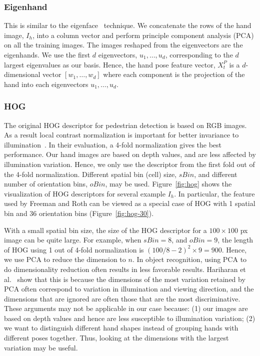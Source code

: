 \documentclass{acm_proc_article-sp}
\begin{document}
\subsubsection{Eigenhand}\label{sec:eigenhand}
This is similar to the eigenface~\cite{turk91} technique. We concatenate the
rows of the hand image, $I_h$, into a column vector and perform principle
component analysis (PCA) on all the training images. The images
reshaped from the eigenvectors are the eigenhands. We use
the first $d$ eigenvectors, $u_1, \ldots, u_d$, corresponding to the 
$d$ largest eigenvalues as our basis.
Hence, the hand pose feature vector, $X_t^P$ is a $d$-dimensional vector $[w_1,
\ldots, w_d]$ where each component is the projection of the hand into each
eigenvectors $u_1, \ldots, u_d$.

\subsubsection{HOG}\label{sec:hog}
The original HOG descriptor for pedestrian detection is based on RGB images. As
a result local contrast normalization is important for better invariance to
illumination~\cite{dalal05}. In their evaluation, a 4-fold normalization
gives the best performance. Our hand images are based on depth values, and are less
affected by illumination variation. Hence, we only use the descriptor from the first fold
out of the 4-fold normalization. Different spatial bin (cell) size, $sBin$, and
different number of orientation bins, $oBin$, may be used. Figure~\ref{fig:hog}
shows the visualization of HOG descriptors for several example $I_h$.
In particular, the feature used by Freeman and Roth can be viewed 
as a special case of HOG with 1 spatial bin and 36 orientation bins (Figure~\ref{fig:hog-30}).

With a small spatial bin size, the size of the HOG descriptor for a $100\times 100$ px image can be
quite large. For example, when $sBin = 8$, and $oBin = 9$, the length of HOG using 1 out of 4-fold
normalization is $(100/8 - 2)^2\times 9 = 900$. Hence, we use PCA to reduce the dimension to $n$.
In object recognition, using PCA to do dimensionality reduction often results in less
favorable results. Hariharan et al.~\cite{Hariharan12} show that this is because the dimensions of the most variation retained by 
PCA often correspond to variation in illumination and viewing direction, and the dimensions
that are ignored are often those that are the most discriminative. These arguments may not
be applicable in our case because: (1) our images are based on depth values and hence are less
susceptible to illumination variation; (2) we want to distinguish different hand shapes instead of grouping hands with different poses
together. Thus, looking at the dimensions with the largest variation may be useful.
\end{document}
